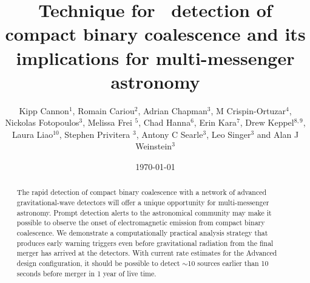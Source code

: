 \documentclass{iopart}
\begin{document}
\title[LLOID]{Technique for \earlywarning\ detection of compact binary
coalescence and its implications for multi-messenger astronomy}

\date{\today}

\author{Kipp Cannon$^{1}$, Romain Cariou$^{2}$, Adrian Chapman$^3$, M
Crispin-Ortuzar$^4$, Nickolas Fotopoulos$^3$, Melissa Frei $^5$, Chad
Hanna$^{6}$, Erin Kara$^{7}$, Drew Keppel$^{8,9}$, Laura Liao$^{10}$, Stephen
Privitera $^3$, Antony C Searle$^3$, Leo Singer$^3$ and Alan J  Weinstein$^3$}

\address{$^1$ Canadian Institute for Theoretical Astrophysics, Toronto, ON,
Canada}
\address{$^2$  D\'{e}partement de physique, \'{E}cole Normale Sup\'{e}rieure de Cachan, Cachan, France}
\address{$^3$ LIGO Laboratory - California Institute of Technology, Pasadena,
CA, USA} 
\address{$^4$ Facultat de F\'{i}sica, Universitat de Val\`{e}ncia, Burjassot,
Spain} 
\address{$^5$ The University of Texas at Austin, Austin, TX, USA}
\address{$^6$ Perimeter Institute for Theoretical Physics, Waterloo, ON,
Canada} 
\address{$^7$ Department of Physics and Astronomy, Barnard College, Columbia
University, New York, NY, USA} 
\address{$^8$ Albert-Einstein-Institut, Max-Planck-Institut f\"{u}r
Gravitationphysik, Hannover, Germany} 
\address{$^9$ Leibniz Universit\"{a}t Hannover, Hannover, Germany}
\address{$^{10}$ Ryerson University, Toronto, ON, Canada}

\begin{abstract}
The rapid detection of compact binary coalescence with a network of advanced
gravitational-wave detectors will offer a unique opportunity for
multi-messenger astronomy.  Prompt detection alerts to the astronomical
community may make it possible to observe the onset of electromagnetic emission
from compact binary coalescence.  We demonstrate a computationally practical
analysis strategy that produces early warning triggers even before
gravitational radiation from the final merger has arrived at the detectors.
With current rate estimates for the Advanced \LIGO{} design configuration, it
should be possible to detect $\sim$10 sources earlier than 10 seconds before
merger in 1 year of live time.
\end{abstract}









\end{document}
